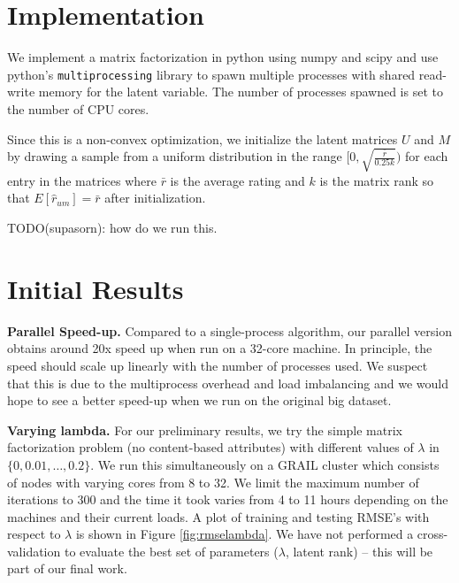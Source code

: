\documentclass{article} %
\begin{document}
\section{Implementation}

We implement a matrix factorization in python using numpy and scipy and use python's \texttt{multiprocessing} library to spawn multiple processes with shared read-write memory for the latent variable. The number of processes spawned is set to the number of CPU cores.

Since this is a non-convex optimization, we initialize the latent matrices $U$ and $M$ by drawing a sample from a uniform distribution in the range $[0,\sqrt{\frac{\bar{r}}{0.25k}})$ for each entry in the matrices where $\bar{r}$ is the average rating and $k$ is the matrix rank so that $E[\hat{r}_{um}] = \bar{r}$ after initialization.

TODO(supasorn): how do we run this.

\section{Initial Results}

\textbf{Parallel Speed-up.}  Compared to a single-process algorithm, our
parallel version obtains around 20x speed up when run on a 32-core machine. In
principle, the speed should scale up linearly with the number of processes
used. We suspect that this is due to the multiprocess overhead and load
imbalancing and we would hope to see a better speed-up when we run on the
original big dataset.

\textbf{Varying lambda.}  For our preliminary results, we try the simple
matrix factorization problem (no content-based attributes) with different
values of $\lambda$ in $\{0, 0.01, \ldots, 0.2\}$. We run this simultaneously
on a GRAIL cluster which consists of nodes with varying cores from 8 to 32. We
limit the maximum number of iterations to 300 and the time it took varies from
4 to 11 hours depending on the machines and their current loads. A plot of
training and testing RMSE's with respect to $\lambda$ is shown in Figure
\ref{fig:rmselambda}. We have not performed a cross-validation to evaluate the
best set of parameters ($\lambda$, latent rank) -- this will be part of our
final work.


\end{document}
